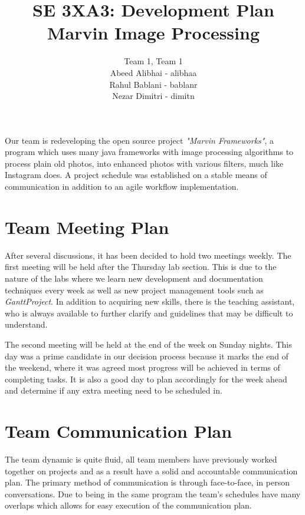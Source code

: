 \documentclass{article}
\begin{document}
\title{SE 3XA3: Development Plan \\ Marvin Image Processing}
\maketitle
\begin{center}
\author{Team 1, Team 1\\Abeed Alibhai - alibhaa\\Rahul Bablani - bablanr\\Nezar Dimitri - dimitn}
\end{center}
Our team is redeveloping the open source project \textit{"Marvin Frameworks"}, a program which uses many java frameworks with image processing algorithms to process plain old photos, into enhanced photos with various filters, much like Instagram does. A project schedule was established on a stable means of communication in addition to an agile workflow implementation.

\section{Team Meeting Plan}
After several discussions, it has been decided to hold two meetings weekly. The first meeting will be held after the Thursday lab section. This is due to the nature of the labs where we learn new development and documentation techniques every week as well as new project management tools such as \textit{GanttProject}. In addition to acquiring new skills, there is the teaching assistant, who is always available to further clarify and guidelines that may be difficult to understand. 

The second meeting will be held at the end of the week on Sunday nights. This day was a prime candidate in our decision process because it marks the end of the weekend, where it was agreed most progress will be achieved in terms of completing tasks. It is also a good day to plan accordingly for the week ahead and determine if any extra meeting need to be scheduled in.

\section{Team Communication Plan}
The team dynamic is quite fluid, all team members have previously worked together on projects and as a result have a solid and accountable communication plan. The primary method of communication is through face-to-face, in person conversations. Due to being in the same program the team's schedules have many overlaps which allows for easy execution of the communication plan. 
\end{document}
